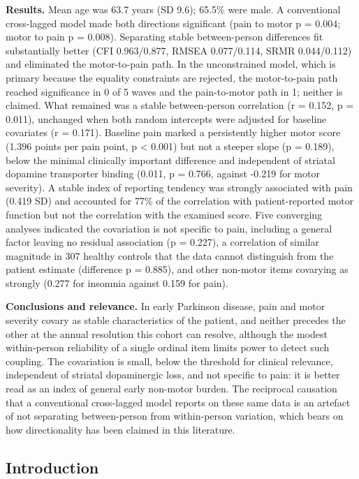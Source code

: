 \documentclass[
  english,
  12pt,
]{article}
\begin{document}
\textbf{Results.} Mean age was 63.7 years (SD 9.6); 65.5\% were male. A conventional cross-lagged model made both directions significant (pain to motor p = 0.004; motor to pain p = 0.008). Separating stable between-person differences fit substantially better (CFI 0.963/0.877, RMSEA 0.077/0.114, SRMR 0.044/0.112) and eliminated the motor-to-pain path. In the unconstrained model, which is primary because the equality constraints are rejected, the motor-to-pain path reached significance in 0 of 5 waves and the pain-to-motor path in 1; neither is claimed. What remained was a stable between-person correlation (r = 0.152, p = 0.011), unchanged when both random intercepts were adjusted for baseline covariates (r = 0.171). Baseline pain marked a persistently higher motor score (1.396 points per pain point, p \textless{} 0.001) but not a steeper slope (p = 0.189), below the minimal clinically important difference and independent of striatal dopamine transporter binding (0.011, p = 0.766, against -0.219 for motor severity). A stable index of reporting tendency was strongly associated with pain (0.419 SD) and accounted for 77\% of the correlation with patient-reported motor function but not the correlation with the examined score. Five converging analyses indicated the covariation is not specific to pain, including a general factor leaving no residual association (p = 0.227), a correlation of similar magnitude in 307 healthy controls that the data cannot distinguish from the patient estimate (difference p = 0.885), and other non-motor items covarying as strongly (0.277 for insomnia against 0.159 for pain).

\textbf{Conclusions and relevance.} In early Parkinson disease, pain and motor severity covary as stable characteristics of the patient, and neither precedes the other at the annual resolution this cohort can resolve, although the modest within-person reliability of a single ordinal item limits power to detect such coupling. The covariation is small, below the threshold for clinical relevance, independent of striatal dopaminergic loss, and not specific to pain: it is better read as an index of general early non-motor burden. The reciprocal causation that a conventional cross-lagged model reports on these same data is an artefact of not separating between-person from within-person variation, which bears on how directionality has been claimed in this literature.

\subsection{Introduction}\label{introduction}
\end{document}
